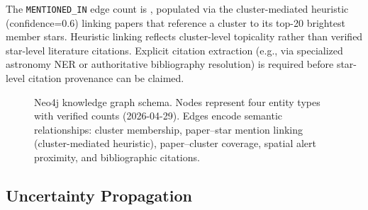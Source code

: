 \documentclass[preprint,12pt,authoryear]{elsarticle}
\begin{document}
The \texttt{MENTIONED\_IN} edge count is \textbf{\nMentionedInEdges{}}, populated via the cluster-mediated heuristic (confidence=0.6) linking papers that reference a cluster to its top-20 brightest member stars. Heuristic linking reflects cluster-level topicality rather than verified star-level literature citations. Explicit citation extraction (e.g., via specialized astronomy NER or authoritative bibliography resolution) is required before star-level citation provenance can be claimed.

\begin{figure}[htbp]
\centering
{}
\caption{\label{fig:graph_schema}Neo4j knowledge graph schema. Nodes represent four entity types with verified counts (2026-04-29). Edges encode semantic relationships: cluster membership, paper--star mention linking (cluster-mediated heuristic), paper--cluster coverage, spatial alert proximity, and bibliographic citations.}
\end{figure}

\subsection{Uncertainty Propagation}
\label{sec:uncertainty}
\end{document}
